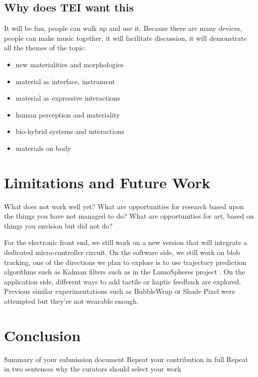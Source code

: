 \documentclass{sigchi-ext}
\begin{document}
\subsection{Why does TEI want this}
It will be fun, people can walk up and use it. Because there are many devices, people can make music together, it will facilitate discussion, it will demonstrate all the themes of the topic:
\begin{itemize}
\item new materialities and morphologies
\item material as interface, instrument
\item material as expressive interactions
\item human perception and materiality
\item bio-hybrid systems and interactions
\item materials on body
\end{itemize}


\section{Limitations and Future Work}

What does not work well yet?
What are opportunities for research based upon the things you have not managed to do?
What are opportunities for art, based on things you envision but did not do?

For the electronic front end, we still work on a new version that will integrate a dedicated micro-controller circuit.
On the software side, we still work on blob tracking, one of the directions we plan to explore is to use trajectory prediction algorithms such as Kalman filters such as in the LumoSpheres project \cite{lumospheres}.
On the application side, different ways to add tactile or haptic feedback are explored. Previous similar experimentations such as BubbleWrap \cite{bubblewrap} or Shade Pixel \cite{shadepixel} were attempted but they're not wearable enough.


\section{Conclusion}
Summary of your submission document
Repeat your contribution in full
Repeat in two sentences why the curators should select your work




\end{document}
